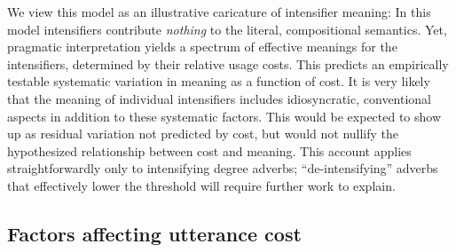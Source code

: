 \documentclass[10pt,letterpaper]{article}
\begin{document}
We view this model as an illustrative caricature of intensifier meaning: In this model intensifiers contribute \emph{nothing} to the literal, compositional semantics.
Yet, pragmatic interpretation yields a spectrum of effective meanings for the intensifiers, determined by their relative usage costs.
This predicts an empirically testable systematic variation in meaning as a function of cost.
It is very likely that the meaning of individual intensifiers includes idiosyncratic, conventional aspects in addition to these systematic factors.
This would be expected to show up as residual variation not predicted by cost, but would not nullify the hypothesized relationship between cost and meaning.
This account applies straightforwardly only to intensifying degree adverbs; ``de-intensifying'' adverbs that effectively lower the threshold will require further work to explain.


% 


\subsection{Factors affecting utterance cost}
\end{document}
